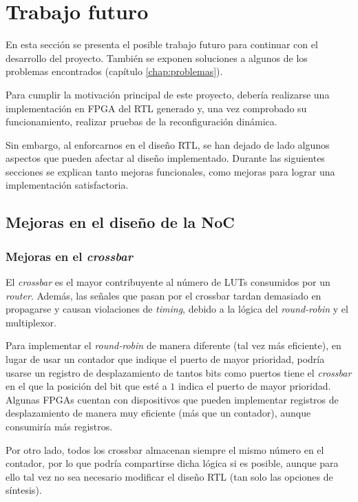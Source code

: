 \chapter{Trabajo futuro}
\label{chap:trabajo_futuro}

En esta sección se presenta el posible trabajo futuro para continuar con el desarrollo del proyecto. También se exponen soluciones a algunos de los problemas encontrados (capítulo \ref{chap:problemas}).

Para cumplir la motivación principal de este proyecto, debería realizarse una implementación en FPGA del RTL generado y, una vez comprobado su funcionamiento, realizar pruebas de la reconfiguración dinámica.

Sin embargo, al enforcarnos en el diseño RTL, se han dejado de lado algunos aspectos que pueden afectar al diseño implementado. Durante las siguientes secciones se explican tanto mejoras funcionales, como mejoras para lograr una implementación satisfactoria.

\section{Mejoras en el diseño de la NoC}

\subsection{Mejoras en el \textit{crossbar}}
El \textit{crossbar} es el mayor contribuyente al número de LUTs consumidos por un \textit{router}. Además, las señales que pasan por el crossbar tardan demasiado en propagarse y causan violaciones de \textit{timing}, debido a la lógica del \textit{round-robin} y el multiplexor.

Para implementar el \textit{round-robin} de manera diferente (tal vez más eficiente), en lugar de usar un contador que indique el puerto de mayor prioridad, podría usarse un registro de desplazamiento de tantos bits como puertos tiene el \textit{crossbar} en el que la posición del bit que esté a $1$ indica el puerto de mayor prioridad. Algunas FPGAs cuentan con dispositivos que pueden implementar registros de desplazamiento de manera muy eficiente (más que un contador), aunque consumiría más registros.

Por otro lado, todos los crossbar almacenan siempre el mismo número en el contador, por lo que podría compartirse dicha lógica si es posible, aunque para ello tal vez no sea necesario modificar el diseño RTL (tan solo las opciones de síntesis).

